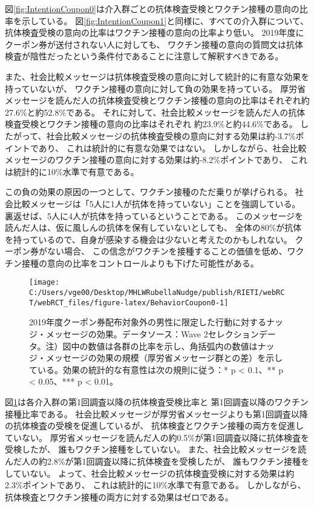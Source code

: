 \documentclass[
  11pt,
  a4paper,
]{article}
\begin{document}
図\ref{fig:IntentionCoupon0}は介入群ごとの抗体検査受検とワクチン接種の意向の比率を示している。
図\ref{fig:IntentionCoupon1}と同様に、すべての介入群について、
抗体検査受検の意向の比率はワクチン接種の意向の比率より低い。
2019年度にクーポン券が送付されない人に対しても、
ワクチン接種の意向の質問文は抗体検査が陰性だったという条件付であることに注意して解釈すべきである。

また、社会比較メッセージは抗体検査受検の意向に対して統計的に有意な効果を持っていないが、
ワクチン接種の意向に対して負の効果を持っている。
厚労省メッセージを読んだ人の抗体検査受検とワクチン接種の意向の比率はそれぞれ約27.6\%と約52.8\%である。
それに対して、社会比較メッセージを読んだ人の抗体検査受検とワクチン接種の意向の比率はそれぞれ
約23.9\%と約44.6\%である。
したがって、社会比較メッセージの抗体検査受検の意向に対する効果は約-3.7\%ポイントであり、
これは統計的に有意な効果ではない。
しかしながら、社会比較メッセージのワクチン接種の意向に対する効果は約-8.2\%ポイントであり、
これは統計的に10\%水準で有意である。

この負の効果の原因の一つとして、ワクチン接種のただ乗りが挙げられる。
社会比較メッセージは「5人に1人が抗体を持っていない」ことを強調している。
裏返せば、5人に4人が抗体を持っているということである。
このメッセージを読んだ人は、仮に風しんの抗体を保有していないとしても、
全体の80\%が抗体を持っているので、自身が感染する機会は少ないと考えたのかもしれない。
クーポン券がない場合、
この信念がワクチンを接種することの価値を低め、ワクチン接種の意向の比率をコントロールよりも下げた可能性がある。

\begin{figure}[t]
\texttt{[image: C:/Users/vge00/Desktop/MHLWRubellaNudge/publish/RIETI/webRCT/webRCT\_files/figure-latex/BehaviorCoupon0-1]} \caption{2019年度クーポン券配布対象外の男性に限定した行動に対するナッジ・メッセージの効果。データソース：Wave 2セレクションデータ。注）図中の数値は各群の比率を示し、角括弧内の数値はナッジ・メッセージの効果の規模（厚労省メッセージ群との差）を示している。効果の統計的な有意性は次の規則に従う：* p < 0.1、** p < 0.05、*** p < 0.01。}\label{fig:BehaviorCoupon0}
\end{figure}

図\ref{fig:BehaviorCoupon0}は各介入群の第1回調査以降の抗体検査受検比率と
第1回調査以降のワクチン接種比率である。
社会比較メッセージが厚労省メッセージよりも第1回調査以降の抗体検査の受検を促進しているが、
抗体検査とワクチン接種の両方を促進していない。
厚労省メッセージを読んだ人の約0.5\%が第1回調査以降に抗体検査を受検したが、
誰もワクチン接種をしていない。
また、社会比較メッセージを読んだ人の約2.8\%が第1回調査以降に抗体検査を受検したが、
誰もワクチン接種をしていない。
よって、社会比較メッセージの抗体検査受検に対する効果は約2.3\%ポイントであり、
これは統計的に10\%水準で有意である。
しかしながら、抗体検査とワクチン接種の両方に対する効果はゼロである。
\end{document}

